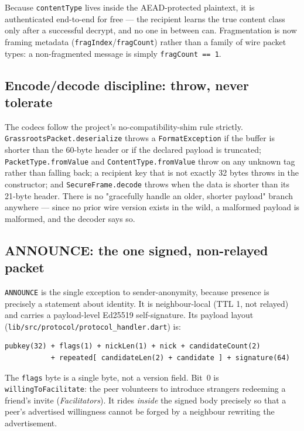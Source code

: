 \documentclass[11pt]{report}
\newcommand{\code}[1]{\texttt{\small #1}}
\begin{document}
Because \code{contentType} lives inside the AEAD-protected plaintext, it is authenticated end-to-end for free — the recipient learns the true content class only after a successful decrypt, and no one in between can. Fragmentation is now framing metadata (\code{fragIndex}/\code{fragCount}) rather than a family of wire packet types: a non-fragmented message is simply \code{fragCount == 1}.

\subsection*{Encode/decode discipline: throw, never tolerate}

The codecs follow the project's no-compatibility-shim rule strictly. \code{GrassrootsPacket.deserialize} throws a \code{FormatException} if the buffer is shorter than the 60-byte header or if the declared payload is truncated; \code{PacketType.fromValue} and \code{ContentType.fromValue} throw on any unknown tag rather than falling back; a recipient key that is not exactly 32 bytes throws in the constructor; and \code{SecureFrame.decode} throws when the data is shorter than its 21-byte header. There is no "gracefully handle an older, shorter payload" branch anywhere — since no prior wire version exists in the wild, a malformed payload is malformed, and the decoder says so.

\subsection*{ANNOUNCE: the one signed, non-relayed packet}

\code{ANNOUNCE} is the single exception to sender-anonymity, because presence is precisely a statement about identity. It is neighbour-local (TTL 1, not relayed) and carries a payload-level Ed25519 self-signature. Its payload layout (\code{lib/src/protocol/protocol_handler.dart}) is:

\begin{verbatim}
pubkey(32) + flags(1) + nickLen(1) + nick + candidateCount(2)
           + repeated[ candidateLen(2) + candidate ] + signature(64)
\end{verbatim}

The \code{flags} byte is a single byte, not a version field. Bit~0 is \code{willingToFacilitate}: the peer volunteers to introduce strangers redeeming a friend's invite (\emph{Facilitators}). It rides \emph{inside} the signed body precisely so that a peer's advertised willingness cannot be forged by a neighbour rewriting the advertisement.
\end{document}
